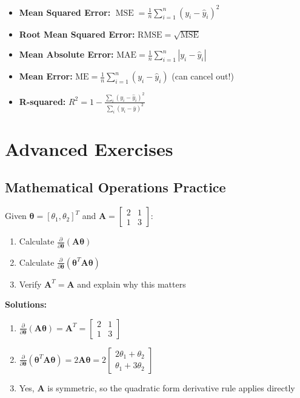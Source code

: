 \documentclass{article}
\providecommand{\vtheta}{\boldsymbol{\theta}}
\providecommand{\mA}{\mathbf{A}}
\providecommand{\MSE}{\operatorname{MSE}}
\newcounter{exercise}
\begin{document}
\begin{itemize}
	\item \textbf{Mean Squared Error:} $\MSE = \frac{1}{n}\sum_{i=1}^n (y_i - \hat{y}_i)^2$
	\item \textbf{Root Mean Squared Error:} $\text{RMSE} = \sqrt{\MSE}$
	\item \textbf{Mean Absolute Error:} $\text{MAE} = \frac{1}{n}\sum_{i=1}^n |y_i - \hat{y}_i|$
	\item \textbf{Mean Error:} $\text{ME} = \frac{1}{n}\sum_{i=1}^n (y_i - \hat{y}_i)$ (can cancel out!)
	\item \textbf{R-squared:} $R^2 = 1 - \frac{\sum_i (y_i - \hat{y}_i)^2}{\sum_i (y_i - \bar{y})^2}$
\end{itemize}

\section{Advanced Exercises}

\subsection{Mathematical Operations Practice}

\begin{tcolorbox}[colback=gray!5!white,colframe=gray!75!black,title=Exercise \stepcounter{exercise}\#\theexercise: Matrix Derivatives]
Given $\vtheta = [\theta_1, \theta_2]^T$ and $\mA = \begin{bmatrix} 2 & 1 \\ 1 & 3 \end{bmatrix}$:
\begin{enumerate}[label=(\alph*)]
	\item Calculate $\frac{\partial}{\partial \vtheta}(\mA\vtheta)$
	\item Calculate $\frac{\partial}{\partial \vtheta}(\vtheta^T\mA\vtheta)$
	\item Verify $\mA^T = \mA$ and explain why this matters
\end{enumerate}

\textbf{Solutions:}
\begin{enumerate}[label=(\alph*)]
	\item $\frac{\partial}{\partial \vtheta}(\mA\vtheta) = \mA^T = \begin{bmatrix} 2 & 1 \\ 1 & 3 \end{bmatrix}$
	\item $\frac{\partial}{\partial \vtheta}(\vtheta^T\mA\vtheta) = 2\mA\vtheta = 2\begin{bmatrix} 2\theta_1 + \theta_2 \\ \theta_1 + 3\theta_2 \end{bmatrix}$
	\item Yes, $\mA$ is symmetric, so the quadratic form derivative rule applies directly
\end{enumerate}
\end{tcolorbox}
\end{document}
